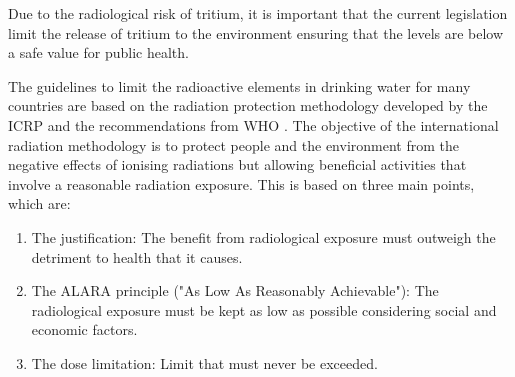 Due to the radiological risk of tritium, it is important that the current legislation limit the release of tritium to the environment ensuring that the levels are below a safe value for public health.

The guidelines to limit the radioactive elements in drinking water for many countries are based on the radiation protection methodology developed by the ICRP \cite{ICRP_GL} and the recommendations from WHO \cite{WHO_GL}. The objective of the international radiation methodology is to  protect people and the environment from the negative effects of ionising radiations but allowing beneficial activities that involve a reasonable radiation exposure. This is based on three main points, which are:
\begin{enumerate}
\item{} The justification: The benefit from radiological exposure must outweigh the detriment to health that it causes.
\item{} The ALARA principle ("As Low As Reasonably Achievable"): The radiological exposure must be kept as low as possible considering social and economic factors.
\item{} The dose limitation: Limit that must never be exceeded.
\end{enumerate}

